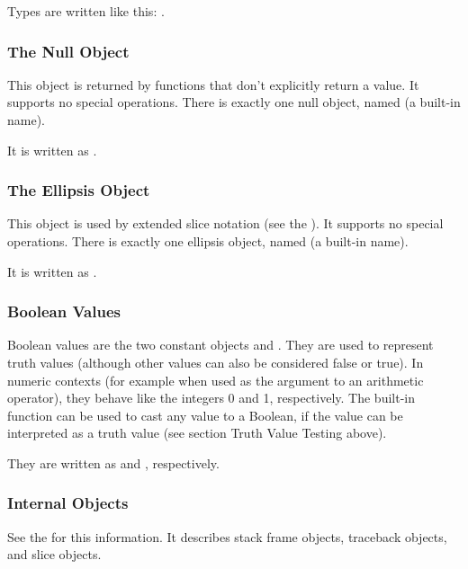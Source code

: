 Types are written like this: .


\subsubsection{The Null Object \label{bltin-null-object}}

This object is returned by functions that don't explicitly return a
value.  It supports no special operations.  There is exactly one null
object, named  (a built-in name).

It is written as .


\subsubsection{The Ellipsis Object \label{bltin-ellipsis-object}}

This object is used by extended slice notation (see the
).  It supports no
special operations.  There is exactly one ellipsis object, named
 (a built-in name).

It is written as .

\subsubsection{Boolean Values}

Boolean values are the two constant objects  and
.  They are used to represent truth values (although other
values can also be considered false or true).  In numeric contexts
(for example when used as the argument to an arithmetic operator),
they behave like the integers 0 and 1, respectively.  The built-in
function  can be used to cast any value to a Boolean,
if the value can be interpreted as a truth value (see section Truth
Value Testing above).

They are written as  and , respectively.


\subsubsection{Internal Objects \label{typesinternal}}

See the  for this
information.  It describes stack frame objects, traceback objects, and
slice objects.


